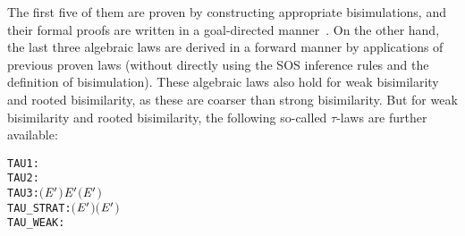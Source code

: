 The first five of them are proven by constructing appropriate bisimulations,
and their formal proofs are written in
a goal-directed manner~\citep[Chapter 4]{holdesc}. On the other hand, the
last three algebraic laws are derived in a forward manner by applications of
previous proven laws (without directly using the SOS
inference rules and the definition of bisimulation).
 These algebraic laws also hold for weak bisimilarity and rooted
  bisimilarity, as these are coarser than strong bisimilarity. But
for weak bisimilarity and rooted bisimilarity, the following so-called
$\tau$-laws are further available:
\begin{alltt}
TAU1:      \HOLTokenTurnstile{} \HOLSymConst{\ensuremath{\ldotp}}\HOLSymConst{\ensuremath{\tau}}\HOLSymConst{\ensuremath{\ldotp}} \HOLSymConst{\HOLTokenObsCongr} \HOLSymConst{\ensuremath{\ldotp}}
TAU2:      \HOLTokenTurnstile{}  \HOLSymConst{\ensuremath{+}} \HOLSymConst{\ensuremath{\tau}}\HOLSymConst{\ensuremath{\ldotp}} \HOLSymConst{\HOLTokenObsCongr} \HOLSymConst{\ensuremath{\tau}}\HOLSymConst{\ensuremath{\ldotp}}
TAU3:      \HOLTokenTurnstile{} \HOLSymConst{\ensuremath{\ldotp}}\ensuremath{(} \HOLSymConst{\ensuremath{+}} \HOLSymConst{\ensuremath{\tau}}\HOLSymConst{\ensuremath{\ldotp}}\ensuremath{\HOLFreeVar{E}\sp{\prime}}\ensuremath{)} \HOLSymConst{\ensuremath{+}} \HOLSymConst{\ensuremath{\ldotp}}\ensuremath{\HOLFreeVar{E}\sp{\prime}} \HOLSymConst{\HOLTokenObsCongr} \HOLSymConst{\ensuremath{\ldotp}}\ensuremath{(} \HOLSymConst{\ensuremath{+}} \HOLSymConst{\ensuremath{\tau}}\HOLSymConst{\ensuremath{\ldotp}}\ensuremath{\HOLFreeVar{E}\sp{\prime}}\ensuremath{)}
TAU_STRAT: \HOLTokenTurnstile{}  \HOLSymConst{\ensuremath{+}} \HOLSymConst{\ensuremath{\tau}}\HOLSymConst{\ensuremath{\ldotp}}\ensuremath{(}\ensuremath{\HOLFreeVar{E}\sp{\prime}} \HOLSymConst{\ensuremath{+}} \ensuremath{)} \HOLSymConst{\HOLTokenObsCongr} \HOLSymConst{\ensuremath{\tau}}\HOLSymConst{\ensuremath{\ldotp}}\ensuremath{(}\ensuremath{\HOLFreeVar{E}\sp{\prime}} \HOLSymConst{\ensuremath{+}} \ensuremath{)}
TAU_WEAK:  \HOLTokenTurnstile{} \HOLSymConst{\ensuremath{\tau}}\HOLSymConst{\ensuremath{\ldotp}} \HOLSymConst{\HOLTokenWeakEQ} 
\end{alltt}

